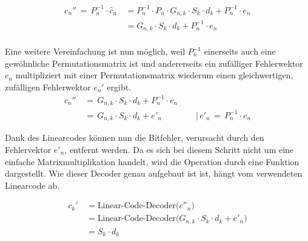 \[      
    \begin{align*}​
      c_{n}''\,=\,P_n^{-1}\cdot \hat{c}_n\,&= P_n^{-1}\cdot P_{n}\cdot G_{n,k}\cdot S_{k}\cdot d_k + P_n^{-1}\cdot e_n \\​
                                           &= G_{n,k}\cdot S_{k}\cdot d_k + P_n^{-1}\cdot e_n \\​
    \end{align*}​
\]

Eine weitere Vereinfachung ist nun möglich,
weil $P_n^{-1}​$ einerseits auch eine gewöhnliche Permutationsmatrix ist
und andererseits ein zufälliger Fehlerwektor $e_n$ multipliziert mit einer Permutationsmatrix
wiederum einen gleichwertigen, zufälligen Fehlerwektor $e_n'$ ergibt.
\[
    \begin{align*}​
        c_{n}''\,&=\,G_{n,k}\cdot S_{k}\cdot d_k + P_n^{-1}\cdot e_n \\​
        &=\,G_{n,k}\cdot S_{k}\cdot d_k + e'_n\quad \quad \quad \quad | \,​
        e'_n\,=\,P_n^{-1}\cdot e_n​
    \end{align*}
\]

Dank des Linearcodes können nun die Bitfehler, verursacht durch den Fehlervektor $e'_n$,
entfernt werden.
Da es sich bei diesem Schritt nicht um eine einfache Matrixmultiplikation handelt,
wird die Operation durch eine Funktion dargestellt.
Wie dieser Decoder genau aufgebaut ist ist,
hängt vom verwendeten Linearcode ab.

\[
    \begin{align*}​
        c_{k}'\,&=\text{Linear-Code-Decoder($c''_n$)}\\​
                &=\text{Linear-Code-Decoder($G_{n,k}\cdot S_{k}\cdot d_k + e'_n$)}\\​
                &=S_{k}\cdot d_k
    \end{align*}
\]